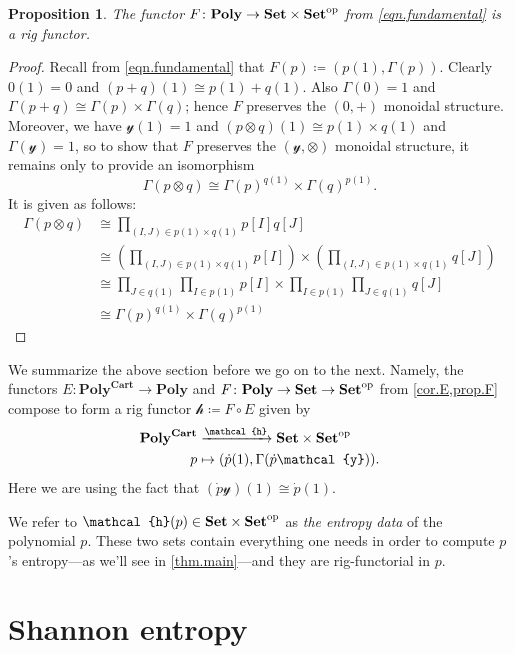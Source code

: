 \documentclass[11pt, one side, article]{memoir}
\theoremstyle{definition}
\theoremstyle{plain}
\newtheorem{proposition}[definitionx]{Proposition}
\newcommand{\Cat}[1]{\mathbf{#1}}%
\newcommand{\To}[2][]{\xrightarrow[#1]{#2}}
\newcommand{\op}{^\tn{op}}
\newcommand{\tn}[1]{\textnormal{#1}}
\newcommand{\smset}{\Cat{Set}}
\newcommand{\yon}{\mathcal{y}}
\newcommand{\poly}{\Cat{Poly}}
\newcommand{\polycart}{\poly^{\Cat{Cart}}}
\newcommand{\hh}{\mathcal{h}}
\newcommand{\0}{\textsf{0}}
\newcommand{\1}{\tn{\textsf{1}}}
\begin{document}
\begin{proposition}\label{prop.F}
The functor $F\colon\poly\to\smset\times\smset\op$ from \eqref{eqn.fundamental} is a rig functor.
\end{proposition}
\begin{proof}
Recall from \eqref{eqn.fundamental} that $F(p)\coloneqq(p(1),\Gamma(p))$. Clearly $0(1)=0$ and $(p+q)(1)\cong p(1)+q(1)$. Also $\Gamma(0)=1$ and $\Gamma(p+q)\cong\Gamma(p)\times\Gamma(q)$; hence $F$ preserves the $(0,+)$ monoidal structure. Moreover, we have $\yon(1)=1$ and $(p\otimes q)(1)\cong p(1)\times q(1)$ and $\Gamma(\yon)= 1$, so to show that $F$ preserves the $(\yon,\otimes)$ monoidal structure, it remains only to provide an isomorphism 
\[
  \Gamma(p\otimes q)\cong \Gamma(p)^{q(1)}\times\Gamma(q)^{p(1)}.
\]
It is given as follows:
\begin{align*}
	\Gamma(p\otimes q)&\cong
	\prod_{(I,J)\in p(1)\times q(1)}p[I]q[J]\\&\cong
	\left(\prod_{(I,J)\in p(1)\times q(1)}p[I]\right)\times
		\left(\prod_{(I,J)\in p(1)\times q(1)}q[J]\right)\\&\cong
	\prod_{J\in q(1)}\prod_{I\in p(1)}p[I]\times\prod_{I\in p(1)}\prod_{J\in q(1)}q[J]\\&\cong
	\Gamma(p)^{q(1)}\times\Gamma(q)^{p(1)}	
\end{align*}
\end{proof}

We summarize the above section before we go on to the next. Namely, the functors $E\colon\polycart\to\poly$ and $F\colon\poly\to\smset\to\smset\op$ from \cref{cor.E,prop.F} compose to form a rig functor $\hh\coloneqq F\circ E$ given by
\begin{equation}\label{eqn.entropy_data}
\begin{aligned}
	\polycart&\To{\mathcal{h}}\smset\times\smset\op\\
	p&\mapsto (\dot{p}(1),\Gamma(\dot{p}\yon)).
\end{aligned}
\end{equation}
Here we are using the fact that $(\dot{p}\yon)(1)\cong\dot{p}(1)$.

We refer to $\hh(p)\in\smset\times\smset\op$ as \emph{the entropy data} of the polynomial $p$. These two sets contain everything one needs in order to compute $p$'s entropy---as we'll see in \cref{thm.main}---and they are rig-functorial in $p$.

\section{Shannon entropy}\label{sec.entropy}
\end{document}
